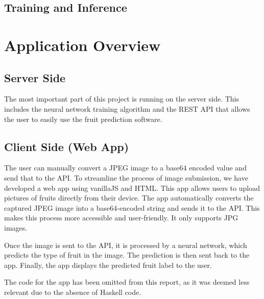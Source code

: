 \documentclass[12pt,a4paper]{article}
\begin{document}
\subsection{Training and Inference}

% 




\section{Application Overview}

\subsection{Server Side}
The most important part of this project is running on the server side. This includes the neural network training algorithm and the REST API that allows the user to easily use the fruit prediction software.

\subsection{Client Side (Web App)}
The user can manually convert a JPEG image to a base64 encoded value and send that to the API.
To streamline the process of image submission, we have developed a web app using vanillaJS and HTML. This app allows users to upload pictures of fruits directly from their device. The app automatically converts the captured JPEG image into a base64-encoded string and sends it to the API. This makes this process more accessible and user-friendly. It only supports JPG images.

Once the image is sent to the API, it is processed by a neural network, which predicts the type of fruit in the image. The prediction is then sent back to the app. Finally, the app displays the predicted fruit label to the user.

The code for the app has been omitted from this report, as it was deemed less relevant due to the absence of Haskell code.



% 

% 

% 

% 

% 





\end{document}
